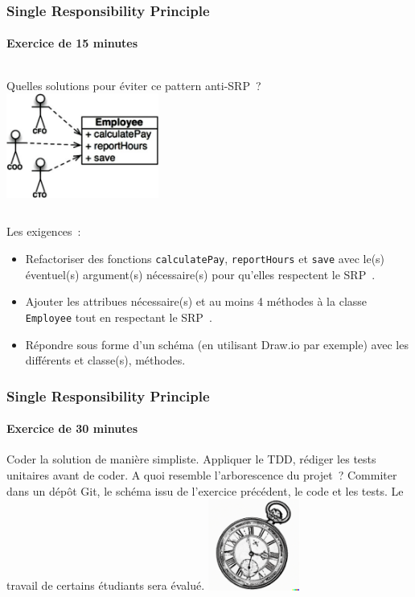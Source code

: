 \documentclass{beamer}
\begin{document}
    \begin{frame}
        \transdissolve
        \frametitle{Single Responsibility Principle}
        \framesubtitle{Exercice \execcounterdispinc{} de 15 minutes}
        \begin{columns}
            Quelles solutions pour éviter ce pattern anti-SRP~?
            \bigbreak
            \centering
            \includegraphics[width=5cm]{image/s-to-avoid}
        \end{columns}
        \flushleft
        Les exigences~:
        \begin{itemize}
            \item Refactoriser des fonctions \lstinline{calculatePay}, \lstinline{reportHours} et \lstinline{save} avec le(s) éventuel(s) argument(s) nécessaire(s) pour qu'elles respectent le SRP~.
            \item Ajouter les attribues nécessaire(s) et au moins 4 méthodes à la classe \lstinline{Employee} tout en respectant le SRP~.
            \item Répondre sous forme d'un schéma (en utilisant Draw.io par exemple) avec les différents et classe(s), méthodes.
        \end{itemize}
    \end{frame}

    \begin{frame}
        \transdissolve
        \frametitle{Single Responsibility Principle}
        \framesubtitle{Exercice \execcounterdispinc{} de 30 minutes}
        Coder la solution de manière simpliste.
        \bigbreak
        Appliquer le TDD, rédiger les tests unitaires avant de coder.
        \bigbreak
        A quoi resemble l'arborescence du projet~?
        \bigbreak
        Commiter dans un dépôt Git, le schéma issu de l'exercice précédent, le code et les tests.
        \bigbreak
        Le travail de certains étudiants sera évalué.
        \bigbreak
        \centering
        \includegraphics[width=3cm]{image/engraving-of-an-old-watch}
    \end{frame}
\end{document}

